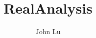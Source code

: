 \documentclass[a4paper,12pt]{report}
\begin{document}
\author{John Lu}
\title{RealAnalysis}


\maketitle
\tableofcontents






\end{document}
